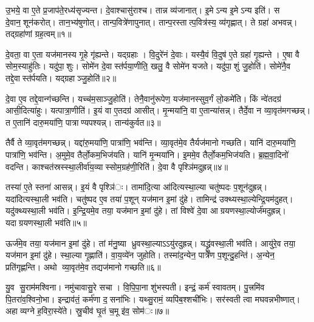 

उ॒भये॒ वा ए॒ते प्र॒जाप॑ते॒रध्य॑सृज्यन्त। दे॒वाश्चासु॑राश्च। तान्न व्य॑जानात्। इ॒मेऽन्य इ॒मेऽन्य इति॑। स दे॒वान॒शून॑करोत्। तान॒भ्य॑षुणोत्। तान्प॒वित्रे॑णापुनात्। तान्प॒रस्तात्प॒वित्र॑स्य॒ व्य॑गृह्णात्। ते ग्रहा॑ अभवन्न्। तद्ग्रहा॑णां ग्रह॒त्वम्॥१॥

दे॒वता॒ वा ए॒ता यज॑मानस्य गृ॒हे गृ॑ह्यन्ते। यद्ग्रहाः। वि॒दुरे॑नं दे॒वाः। यस्यै॒वं वि॒दुष॑ ए॒ते ग्रहा॑ गृ॒ह्यन्ते। ए॒षा वै सोम॒स्याहु॑तिः। यदु॑पा॒शुः। सोमे॑न दे॒वास्त॑र्पया॒णीति॒ खलु॒ वै सोमे॑न यजते। यदु॑पा॒शुं जु॒होति॑। सोमे॑नै॒व तद्दे॒वास्त॑र्पयति। यद्ग्रहाञ्जु॒होति॑॥२॥

दे॒वा ए॒व तद्दे॒वान्ग॑च्छन्ति। यच्च॑म॒साञ्जु॒होति॑। तेनै॒वानु॑रूपेण॒ यज॑मानस्सुव॒र्गं लो॒कमे॑ति। किं न्वे॑तदग्र॑ आसी॒दित्या॑हुः। यत्पात्रा॒णीति॑। इ॒यं वा ए॒तदग्र॑ आसीत्। मृ॒न्मया॑नि॒ वा ए॒तान्या॑सन्न्। तैर्दे॒वा न व्या॒वृत॑मगच्छन्न्। त ए॒तानि॑ दारु॒मया॑णि॒ पात्राण्यपश्यन्न्। तान्य॑कुर्वत॥३॥

तैर्वै ते व्या॒वृत॑मगच्छन्न्। यद्दा॑रु॒मया॑णि॒ पात्रा॑णि॒ भव॑न्ति। व्या॒वृत॑मे॒व तैर्यज॑मानो गच्छति। यानि॑ दारु॒मया॑णि॒ पात्रा॑णि॒ भव॑न्ति। अ॒मुमे॒व तैर्लो॒कम॒भिज॑यति। यानि॑ मृ॒न्मया॑नि। इ॒ममे॒व तैर्लो॒कम॒भिज॑यति। ब्र॒ह्म॒वा॒दिनो॑ वदन्ति। काश्चत॑स्रस्स्था॒लीर्वा॑य॒व्यास्सोम॒ग्रह॑णी॒रिति॑। दे॒वा वै पृश्ञि॑मदुह्रन्न्॥४॥

तस्या॑ ए॒ते स्तना॑ आसन्न्। इ॒यं वै पृश्ञि॑ः। तामा॑दि॒त्या आ॑दित्यस्था॒ल्या चतु॑ष्पदः प॒शून॑दुह्रन्न्। यदा॑दित्यस्था॒ली भव॑ति। चतु॑ष्पद ए॒व तया॑ प॒शून् यज॑मान इ॒मां दु॑हे। तामिन्द्र॑ उक्थ्यस्था॒ल्येन्द्रि॒यम॑दुहत्। यदु॑क्थ्यस्था॒ली भव॑ति। इ॒न्द्रि॒यमे॒व तया॒ यज॑मान इ॒मां दु॑हे। तां विश्वे॑ दे॒वा आग्रयणस्था॒ल्योर्ज॑मदुह्रन्न्। यदाग्रयणस्था॒ली भव॑ति॥५॥

ऊर्ज॑मे॒व तया॒ यज॑मान इ॒मां दु॑हे। तां म॑नु॒ष्या ध्रुवस्था॒ल्याऽऽयु॑रदुह्रन्न्। यद्ध्रु॑वस्था॒ली भव॑ति। आयु॑रे॒व तया॒ यज॑मान इ॒मां दु॑हे। स्था॒ल्या गृ॒ह्णाति॑। वा॒य॒व्ये॑न जुहोति। तस्मा॑द॒न्येन॒ पात्रे॑ण प॒शून्दु॒हन्ति॑। अ॒न्येन॒ प्रति॑गृह्णन्ति। अथो व्या॒वृत॑मे॒व तद्यज॑मानो गच्छति॥६॥


यु॒व सु॒राम॑मश्विना। नमु॑चावासु॒रे सचा। वि॒पि॒पा॒ना शु॑भस्पती। इन्द्रं॒ कर्म॑ स्वावतम्। पु॒त्त्रमि॑व पि॒तरा॑व॒श्विनो॒भा। इन्द्राव॑तं॒ कर्म॑णा द॒सना॑भिः। यथ्सु॒रामं॒ व्यपि॑ब॒श्शची॑भिः। सर॑स्वती त्वा मघवन्नभीष्णात्। अहाव्यग्ने ह॒विरा॒स्ये॑ते। स्रु॒चीव॑ घृ॒तं च॒मू इ॑व॒ सोम॑ः॥७॥

